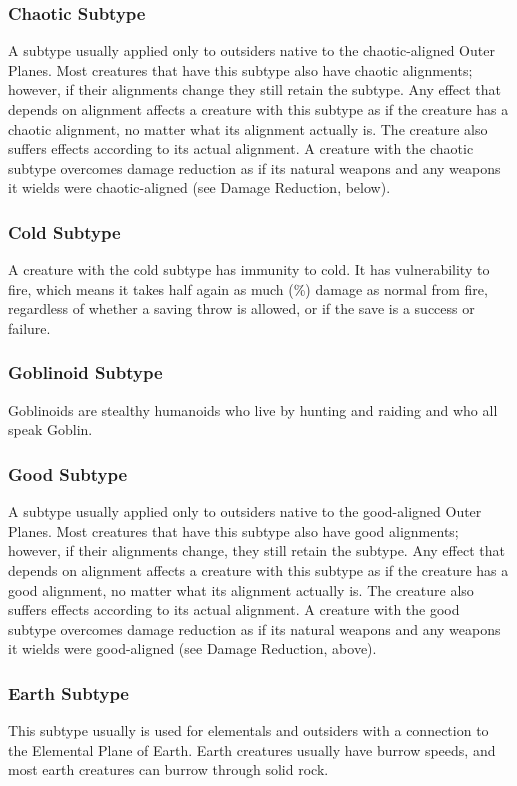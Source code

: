 \subsubsection{Chaotic Subtype} A subtype usually applied only to outsiders native to the chaotic-aligned Outer Planes. Most creatures that have this subtype also have chaotic alignments; however, if their alignments change they still retain the subtype. Any effect that depends on alignment affects a creature with this subtype as if the creature has a chaotic alignment, no matter what its alignment actually is. The creature also suffers effects according to its actual alignment. A creature with the chaotic subtype overcomes damage reduction as if its natural weapons and any weapons it wields were chaotic-aligned (see Damage Reduction, below).

\subsubsection{Cold Subtype} A creature with the cold subtype has immunity to cold. It has vulnerability to fire, which means it takes half again as much (\%) damage as normal from fire, regardless of whether a saving throw is allowed, or if the save is a success or failure. 

\subsubsection{Goblinoid Subtype} Goblinoids are stealthy humanoids who live by hunting and raiding and who all speak Goblin.

\subsubsection{Good Subtype} A subtype usually applied only to outsiders native to the good-aligned Outer Planes. Most creatures that have this subtype also have good alignments; however, if their alignments change, they still retain the subtype. Any effect that depends on alignment affects a creature with this subtype as if the creature has a good alignment, no matter what its alignment actually is. The creature also suffers effects according to its actual alignment. A creature with the good subtype overcomes damage reduction as if its natural weapons and any weapons it wields were good-aligned (see Damage Reduction, above).

\subsubsection{Earth Subtype} This subtype usually is used for elementals and outsiders with a connection to the Elemental Plane of Earth. Earth creatures usually have burrow speeds, and most earth creatures can burrow through solid rock.

